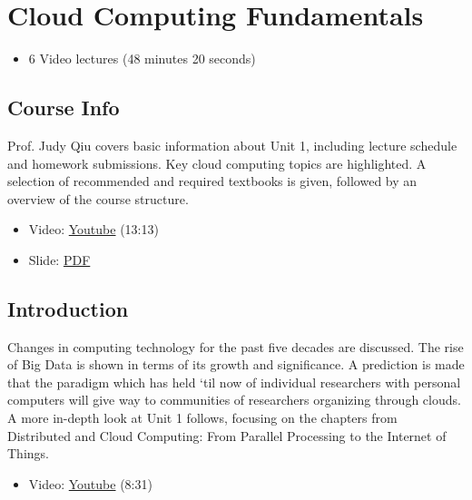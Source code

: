 \FILENAME

\chapter{Cloud Computing
Fundamentals}\label{cloud-computing-fundamentals}

\begin{itemize}
\tightlist
\item
  6 Video lectures (48 minutes 20 seconds)
\end{itemize}

\section{Course Info}\label{course-info}

Prof. Judy Qiu covers basic information about Unit 1, including lecture
schedule and homework submissions. Key cloud computing topics are
highlighted. A selection of recommended and required textbooks is given,
followed by an overview of the course structure.

\begin{itemize}
\tightlist
\item
  Video: \href{https://www.youtube.com/watch?v=Kde5YVUwDTQ}{Youtube}
  (13:13)
\end{itemize}

\begin{itemize}
\tightlist
\item
  Slide:
  \href{https://drive.google.com/open?id=0B88HKpainTSfYjU4QzdDSms0Nk0}{PDF}
\end{itemize}

\section{Introduction}\label{introduction}

Changes in computing technology for the past five decades are discussed.
The rise of Big Data is shown in terms of its growth and significance. A
prediction is made that the paradigm which has held `til now of
individual researchers with personal computers will give way to
communities of researchers organizing through clouds. A more in-depth
look at Unit 1 follows, focusing on the chapters from Distributed and
Cloud Computing: From Parallel Processing to the Internet of Things.

\begin{itemize}
\tightlist
\item
  Video: \href{https://www.youtube.com/watch?v=5lKj8_nqj9k}{Youtube}
  (8:31)
\end{itemize}

